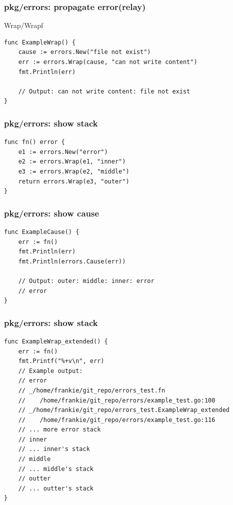 \documentclass[9pt]{beamer}
\begin{document}
\begin{frame}[fragile]
\frametitle{pkg/errors: propagate error(relay)}


Wrap/Wrapf


\begin{verbatim}
func ExampleWrap() {
	cause := errors.New("file not exist")
	err := errors.Wrap(cause, "can not write content")
	fmt.Println(err)

	// Output: can not write content: file not exist
}

\end{verbatim}


\end{frame}

\begin{frame}[fragile]
\frametitle{pkg/errors: show stack}


\begin{verbatim}
func fn() error {
	e1 := errors.New("error")
	e2 := errors.Wrap(e1, "inner")
	e3 := errors.Wrap(e2, "middle")
	return errors.Wrap(e3, "outer")
}

\end{verbatim}


\end{frame}

\begin{frame}[fragile]
\frametitle{pkg/errors: show cause}


\begin{verbatim}
func ExampleCause() {
	err := fn()
	fmt.Println(err)
	fmt.Println(errors.Cause(err))

	// Output: outer: middle: inner: error
	// error
}

\end{verbatim}


\end{frame}

\begin{frame}[fragile]
\frametitle{pkg/errors: show stack}


\begin{verbatim}
func ExampleWrap_extended() {
	err := fn()
	fmt.Printf("%+v\n", err)
	// Example output:
	// error
    // _/home/frankie/git_repo/errors_test.fn
	//    /home/frankie/git_repo/errors/example_test.go:100
    // _/home/frankie/git_repo/errors_test.ExampleWrap_extended
	//    /home/frankie/git_repo/errors/example_test.go:116
	// ... more error stack
	// inner
	// ... inner's stack
	// middle
	// ... middle's stack
	// outter
	// ... outter's stack
}

\end{verbatim}


\end{frame}
\end{document}
